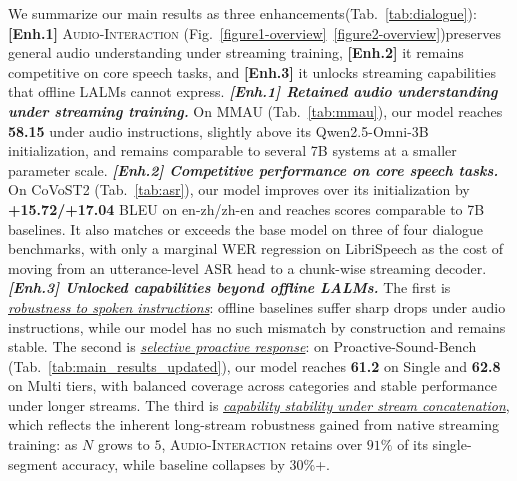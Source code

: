 \documentclass{llmxive}
\begin{document}
We summarize our main results as three enhancements(Tab.~\ref{tab:dialogue}): \textbf{[Enh.1]}  \textsc{Audio-Interaction} (Fig.~\ref{figure1-overview}~\ref{figure2-overview})preserves general audio understanding under streaming training, \textbf{[Enh.2]} it remains competitive on core speech tasks, and \textbf{[Enh.3]} it unlocks streaming capabilities that offline LALMs cannot express.
\textit{\textbf{[Enh.1] Retained audio understanding under streaming training.}} On MMAU (Tab.~\ref{tab:mmau}), our model reaches \textbf{58.15} under audio instructions, slightly above its Qwen2.5-Omni-3B initialization, and remains comparable to several 7B systems at a smaller parameter scale.
\textit{\textbf{[Enh.2] Competitive performance on core speech tasks.}} On CoVoST2 (Tab.~\ref{tab:asr}), our model improves over its initialization by \textbf{+15.72/+17.04} BLEU on en-zh/zh-en and reaches scores comparable to 7B baselines. It also matches or exceeds the base model on three of four dialogue benchmarks, with only a marginal WER regression on LibriSpeech as the cost of moving from an utterance-level ASR head to a chunk-wise streaming decoder.
\textit{\textbf{[Enh.3] Unlocked capabilities beyond offline LALMs.}} The first is \underline{\textit{robustness to spoken instructions}}: offline baselines suffer sharp drops under audio instructions, while our model has no such mismatch by construction and remains stable. The second is \underline{\textit{selective proactive response}}: on Proactive-Sound-Bench (Tab.~\ref{tab:main_results_updated}), our model reaches \textbf{61.2} on Single and \textbf{62.8} on Multi tiers, with balanced coverage across categories and stable performance under longer streams. The third is \underline{\textit{capability stability under stream concatenation}}, which reflects the inherent long-stream robustness gained from native streaming training: as $N$ grows to $5$, \textsc{Audio-Interaction} retains over $91\%$ of its single-segment accuracy, while baseline collapses by $30\%$+.
\end{document}
